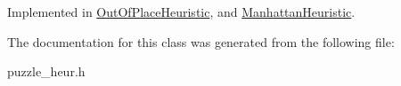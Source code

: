 \-Implemented in \hyperlink{classOutOfPlaceHeuristic_acc042925c642807a995a18ee3393098d}{\-Out\-Of\-Place\-Heuristic}, and \hyperlink{classManhattanHeuristic_a061af5e85bffa6a6f7cebbce17f5e7e5}{\-Manhattan\-Heuristic}.



\-The documentation for this class was generated from the following file\-:\begin{DoxyCompactItemize}
\item 
puzzle\-\_\-heur.\-h\end{DoxyCompactItemize}
